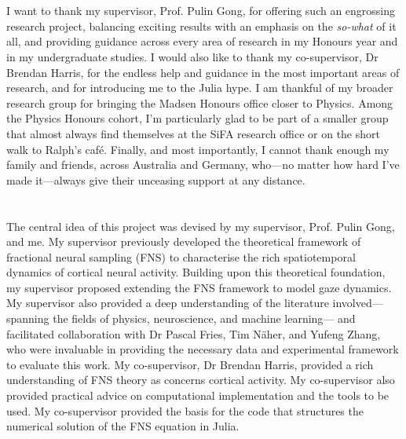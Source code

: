 \begingroup
    \let\clearpage\relax
    \let\cleardoublepage\relax
    
    \chapter*{}
    \vspace{-2em}
    I want to thank my supervisor, Prof. Pulin Gong, for offering such an engrossing research project, balancing exciting results with an emphasis on the \textit{so-what} of it all, and providing guidance across every area of research in my Honours year and in my undergraduate studies. I would also like to thank my co-supervisor, Dr Brendan Harris, for the endless help and guidance in the most important areas of research, and for introducing me to the Julia hype. I am thankful of my broader research group for bringing the Madsen Honours office closer to Physics. Among the Physics Honours cohort, I'm particularly glad to be part of a smaller group that almost always find themselves at the SiFA research office or on the short walk to Ralph's café. Finally, and most importantly, I cannot thank enough my family and friends, across Australia and Germany, who---no matter how hard I've made it---always give their unceasing support at any distance.
    
    \vspace{3em} %
    
    \chapter*{}
    \vspace{-2em}
    The central idea of this project was devised by my supervisor, Prof. Pulin Gong, and me. My supervisor previously developed the theoretical framework of fractional neural sampling (FNS) to characterise the rich spatiotemporal dynamics of cortical neural activity. Building upon this theoretical foundation, my supervisor proposed extending the FNS framework to model gaze dynamics. My supervisor also provided a deep understanding of the literature involved---spanning the fields of physics, neuroscience, and machine learning--- and facilitated collaboration with Dr Pascal Fries, Tim Näher, and Yufeng Zhang, who were invaluable in providing the necessary data and experimental framework to evaluate this work. My co-supervisor, Dr Brendan Harris, provided a rich understanding of FNS theory as concerns cortical activity. My co-supervisor also provided practical advice on computational implementation and the tools to be used. My co-supervisor provided the basis for the code that structures the numerical solution of the FNS equation in Julia.
    

